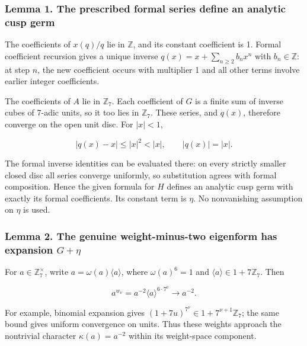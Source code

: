\documentclass[11pt,a4paper]{article}
\begin{document}
\hypertarget{lemma-1.-the-prescribed-formal-series-define-an-analytic-cusp-germ}{%
\subsubsection{Lemma 1. The prescribed formal series define an analytic cusp germ}\label{lemma-1.-the-prescribed-formal-series-define-an-analytic-cusp-germ}}

The coefficients of \(x(q)/q\) lie in \(\mathbb Z\), and its constant coefficient is 1. Formal coefficient recursion gives a unique inverse \(q(x)=x+\sum_{n\ge2}b_nx^n\) with \(b_n\in\mathbb Z\): at step \(n\), the new coefficient occurs with multiplier 1 and all other terms involve earlier integer coefficients.

The coefficients of \(A\) lie in \(\mathbb Z_7\). Each coefficient of \(G\) is a finite sum of inverse cubes of 7-adic units, so it too lies in \(\mathbb Z_7\). These series, and \(q(x)\), therefore converge on the open unit disc. For \(|x|<1\),

\[
|q(x)-x|\le |x|^2<|x|,\qquad |q(x)|=|x|.
\]

The formal inverse identities can be evaluated there: on every strictly smaller closed disc all series converge uniformly, so substitution agrees with formal composition. Hence the given formula for \(H\) defines an analytic cusp germ with exactly its formal coefficients. Its constant term is \(\eta\). No nonvanishing assumption on \(\eta\) is used.

\hypertarget{lemma-2.-the-genuine-weight-minus-two-eigenform-has-expansion-geta}{%
\subsubsection{\texorpdfstring{Lemma 2. The genuine weight-minus-two eigenform has expansion \(G+\eta\)}{Lemma 2. The genuine weight-minus-two eigenform has expansion G+\textbackslash eta}}\label{lemma-2.-the-genuine-weight-minus-two-eigenform-has-expansion-geta}}

For \(a\in\mathbb Z_7^\times\), write \(a=\omega(a)\langle a\rangle\), where \(\omega(a)^6=1\) and \(\langle a\rangle\in1+7\mathbb Z_7\). Then

\[
a^{w_\nu}=a^{-2}\langle a\rangle^{6\cdot7^\nu}\longrightarrow a^{-2}.
\]

For example, binomial expansion gives \((1+7u)^{7^\nu}\in1+7^{\nu+1}\mathbb Z_7\); the same bound gives uniform convergence on units. Thus these weights approach the nontrivial character \(\kappa(a)=a^{-2}\) within its weight-space component.
\end{document}
